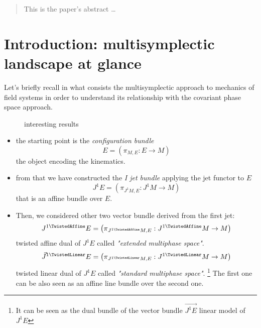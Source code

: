 \documentclass[12pt]{article}
\begin{document}
\maketitle

\begin{abstract}
This is the paper's abstract \ldots
\end{abstract}

\section{Introduction: multisymplectic landscape at glance}
Let's briefly recall in what consists the multisymplectic approach to mechanics of field systems in order to understand its relationship with the covariant phase space approach.

\begin{figure}
  \centering
  
  \caption{interesting results}
\end{figure}

\begin{itemize}
 \item the starting point is the \emph{configuration bundle} 
 	\begin{displaymath}
 		E = \left( \pi_{M,E} : E\rightarrow M \right)
 	\end{displaymath}
 	the object encoding the kinematics.
 \item from that we have constructed the \emph{I jet bundle} applying the jet functor to $E$ 
 	\begin{displaymath}
 	J^1E = \left( \pi_{J^1 M,E} : J^1 M\rightarrow M \right)
 	\end{displaymath} 
 	that is an affine bundle over $E$.
 \item Then, we considered other two vector bundle derived from the first jet:
 	\begin{displaymath}
 	J^{1 \TwistedAffine}E = \left( \pi_{J^{1 \TwistedAffine} M,E} : J^{1 \TwistedAffine} M\rightarrow M \right)
 	\end{displaymath}
	twisted affine dual of $J^1E$ called \emph{"extended multiphase space"}.
	\begin{displaymath}
	\vec{J}^{1 \TwistedLinear}E = \left( \pi_{J^{1 \TwistedLinear} M,E} : J^{1 \TwistedLinear} M\rightarrow M \right)
	\end{displaymath}
	twisted linear dual of $J^1 E$ called \emph{"standard multiphase space"}. \footnote{It can be seen as the dual bundle of the vector bundle $\vec{J^1E}$ linear model of $J^1E$}
	The first one can be also seen as an affine line bundle over the second one.


\end{itemize}
\end{document}
